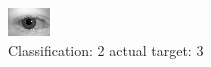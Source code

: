 \begin{figure}[h!]
\begin{center}
\includegraphics[width=0.60\columnwidth]{figures/ID532_class_2_target_3.png}
\end{center}
\caption{ Classification: 2 actual target: 3}
\label{fig:ID532_class_2_target_3}
\end{figure}
